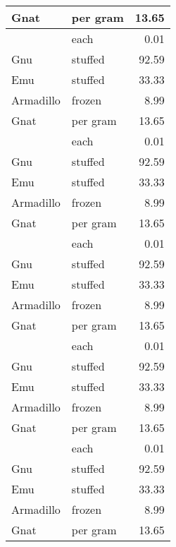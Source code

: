 {\begin{longtable}[l]{|l|l|r|}
\endlastfoot
\rowcolor{latextbl!25}Gnat      & per gram & 13.65 \\
\hline
\rowcolor{latextbl!10}          & each     & 0.01  \\
\hline
\rowcolor{latextbl!25}Gnu       & stuffed  & 92.59 \\
\hline
\rowcolor{latextbl!10}Emu       & stuffed  & 33.33 \\
\hline
\rowcolor{latextbl!25}Armadillo & frozen   & 8.99  \\
\hline
\rowcolor{latextbl!10}Gnat      & per gram & 13.65 \\
\hline
\rowcolor{latextbl!25}          & each     & 0.01  \\
\hline
\rowcolor{latextbl!10}Gnu       & stuffed  & 92.59 \\
\hline
\rowcolor{latextbl!25}Emu       & stuffed  & 33.33 \\
\hline
\rowcolor{latextbl!10}Armadillo & frozen   & 8.99  \\
\hline
\rowcolor{latextbl!25}Gnat      & per gram & 13.65 \\
\hline
\rowcolor{latextbl!10}          & each     & 0.01  \\
\hline
\rowcolor{latextbl!25}Gnu       & stuffed  & 92.59 \\
\hline
\rowcolor{latextbl!10}Emu       & stuffed  & 33.33 \\
\hline
\rowcolor{latextbl!25}Armadillo & frozen   & 8.99  \\
\hline
\rowcolor{latextbl!10}Gnat      & per gram & 13.65 \\
\hline
\rowcolor{latextbl!25}          & each     & 0.01  \\
\hline
\rowcolor{latextbl!10}Gnu       & stuffed  & 92.59 \\
\hline
\rowcolor{latextbl!25}Emu       & stuffed  & 33.33 \\
\hline
\rowcolor{latextbl!10}Armadillo & frozen   & 8.99  \\
\hline
\rowcolor{latextbl!25}Gnat      & per gram & 13.65 \\
\hline
\rowcolor{latextbl!10}          & each     & 0.01  \\
\hline
\rowcolor{latextbl!25}Gnu       & stuffed  & 92.59 \\
\hline
\rowcolor{latextbl!10}Emu       & stuffed  & 33.33 \\
\hline
\rowcolor{latextbl!25}Armadillo & frozen   & 8.99  \\
\hline
\rowcolor{latextbl!10}Gnat      & per gram & 13.65 \\

\end{longtable}}
